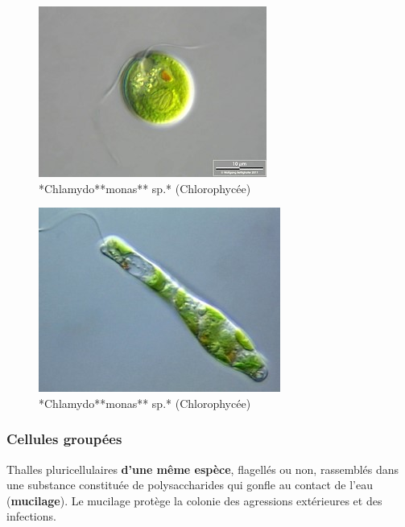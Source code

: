 \documentclass[
]{book}
\begin{document}
\begin{figure}[H]

{\centering \includegraphics[width=0.7\linewidth]{./images/chlamydomonas} 

}

\caption{*Chlamydo**monas** sp.* (Chlorophycée)}\label{fig:chlamydomonas}
\end{figure}

\begin{figure}[H]

{\centering \includegraphics[width=0.7\linewidth]{./images/euglene} 

}

\caption{*Chlamydo**monas** sp.* (Chlorophycée)}\label{fig:euglene}
\end{figure}

\hypertarget{cellules-groupuxe9es}{%
\subsubsection{Cellules groupées}\label{cellules-groupuxe9es}}

Thalles pluricellulaires \textbf{d'une même espèce}, flagellés ou non, rassemblés dans une substance constituée de polysaccharides qui gonfle au contact de l'eau (\textbf{mucilage}). Le mucilage protège la colonie des agressions extérieures et des infections.
\end{document}
